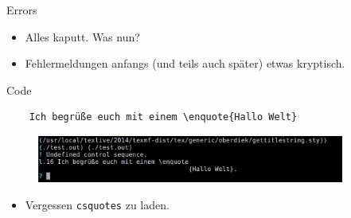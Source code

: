 \begin{frame}[fragile]{Errors}
  \begin{itemize}
    \item Alles kaputt. Was nun?
    \item Fehlermeldungen anfangs (und teils auch später) etwas kryptisch.
  \end{itemize}
  \begin{block}{Code}
    \begin{lstlisting}
    Ich begrüße euch mit einem \enquote{Hallo Welt}
    \end{lstlisting}
  \end{block}
  \begin{figure}
  \centering
  \includegraphics[width=0.9\textwidth]{figures/error1.png}
  \end{figure}
  \begin{itemize}
    \item<2->[$\Rightarrow$] Vergessen \texttt{csquotes} zu laden.
  \end{itemize}
\end{frame}

